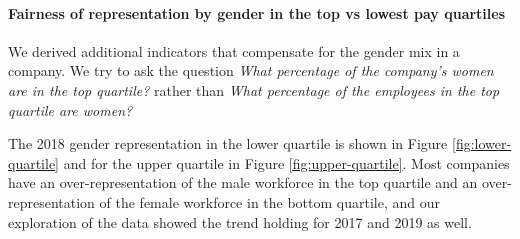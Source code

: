 
\paragraph{Fairness of representation by gender in the top vs lowest pay quartiles}
  We derived additional indicators that compensate for the gender mix in a company. We try to ask the question \textit{What percentage of the company's women are in the top quartile?} rather than \textit{What percentage of the employees in the top quartile are women?} 
   
  The 2018 gender representation in the lower quartile is shown in Figure \ref{fig:lower-quartile} and for the upper
  quartile in Figure \ref{fig:upper-quartile}. Most companies have an over-representation of the male
  workforce in the top quartile and an over-representation of the
  female workforce in the bottom quartile, and our exploration of the data showed the trend holding for 2017 and 2019 as well.
   
